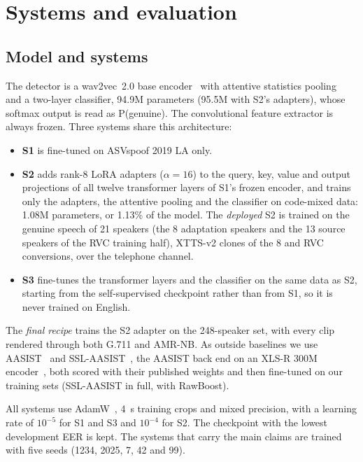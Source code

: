 \documentclass[conference]{IEEEtran}
\begin{document}
\section{Systems and evaluation}

\subsection{Model and systems}

The detector is a wav2vec~2.0 base encoder~\cite{baevski2020wav2vec} with attentive
statistics pooling~\cite{okabe2018attentive} and a two-layer classifier, 94.9M parameters
(95.5M with S2's adapters), whose softmax output is read as P(genuine). The convolutional feature extractor is
always frozen. Three systems share this architecture:
\begin{itemize}
\item \textbf{S1} is fine-tuned on ASVspoof 2019 LA only.
\item \textbf{S2} adds rank-8 LoRA adapters ($\alpha = 16$) to the query, key, value and
output projections of all twelve transformer layers of S1's frozen encoder, and trains
only the adapters, the attentive pooling and the classifier on code-mixed data: 1.08M
parameters, or 1.13\% of
the model. The \emph{deployed} S2 is trained on the genuine speech of 21 speakers (the 8
adaptation speakers and the 13 source speakers of the RVC training half), XTTS-v2 clones of
the 8 and RVC conversions, over the telephone channel.
\item \textbf{S3} fine-tunes the transformer layers and the classifier on the same data as
S2, starting from the self-supervised checkpoint rather than from S1, so it is never
trained on English.
\end{itemize}
The \emph{final recipe} trains the S2 adapter on the 248-speaker set, with every clip
rendered through both G.711 and AMR-NB. As outside baselines we use
AASIST~\cite{jung2022aasist} and SSL-AASIST~\cite{tak2022wav2vec}, the AASIST back end on
an XLS-R 300M encoder~\cite{babu2022xlsr}, both scored with their published weights and
then fine-tuned on our training sets (SSL-AASIST in full, with RawBoost).

All systems use AdamW~\cite{loshchilov2019adamw}, 4~s training crops and mixed precision,
with a learning rate of $10^{-5}$ for S1 and S3 and $10^{-4}$ for S2. The checkpoint with
the lowest development EER is kept. The systems that carry the main claims are trained
with five seeds (1234, 2025, 7, 42 and 99).
\end{document}
